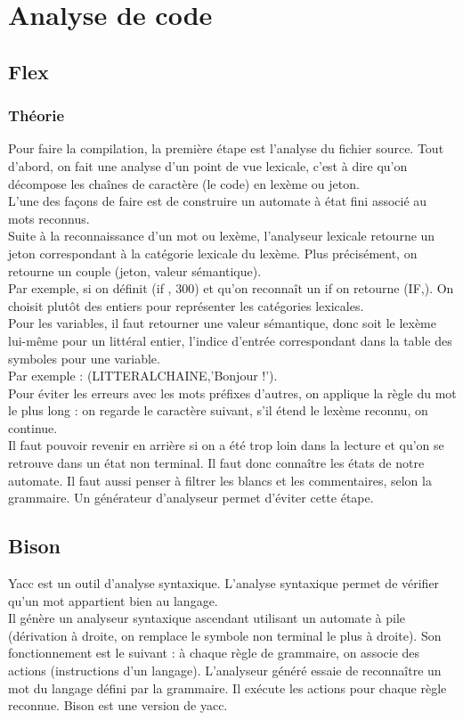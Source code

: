 \section{Analyse de code}

\subsection{Flex}
\subsubsection{Théorie}
Pour faire la compilation, la première étape est l'analyse du fichier source.
Tout d'abord, on fait une analyse d'un point de vue lexicale, c'est à dire qu'on décompose les chaînes de caractère (le code) en lexème ou jeton.\\
L'une des façons de faire est de construire un automate à état fini associé au mots reconnus.\\
Suite à la reconnaissance d'un mot ou lexème, l'analyseur lexicale retourne un jeton correspondant  à la catégorie lexicale du lexème. Plus précisément, on retourne un couple (jeton, valeur sémantique).\\
Par exemple, si on définit  (if , 300) et qu'on reconnaît un if on retourne (IF,).
On choisit plutôt des entiers pour représenter les catégories lexicales.\\
Pour les variables, il faut retourner une valeur sémantique, donc soit le lexème lui-même pour un littéral entier, l'indice d'entrée correspondant dans la table des symboles pour une variable.\\
Par exemple : (LITTERALCHAINE,'Bonjour !').\\
Pour éviter les erreurs avec les mots préfixes d'autres, on applique la règle du mot le plus long : on regarde le caractère suivant, s'il étend le lexème reconnu, on continue.\\
Il faut pouvoir revenir en arrière si on a été trop loin dans la lecture et qu'on se retrouve dans un état non terminal. Il faut donc connaître les états de notre automate.
Il faut aussi penser à filtrer les blancs et les commentaires, selon la grammaire.
Un générateur d'analyseur permet d'éviter cette étape.\\

\subsection{Bison}

Yacc est un outil d'analyse syntaxique. L'analyse syntaxique permet de vérifier qu'un mot appartient bien au langage.\\ Il génère un analyseur syntaxique ascendant utilisant un automate à pile (dérivation à droite, on remplace le symbole non terminal le plus à droite).
 Son fonctionnement est le suivant : à chaque règle de grammaire, on associe des actions (instructions d'un langage). L'analyseur généré essaie de reconnaître un mot du langage défini par la grammaire. Il exécute les actions pour chaque règle reconnue.  Bison est une version de yacc.\\

